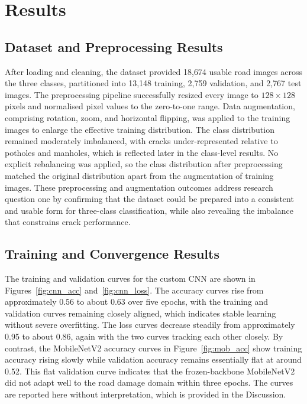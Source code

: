 \documentclass[preprint,12pt]{elsarticle}
\begin{document}
\section{Results}
\label{sec:results}

\subsection{Dataset and Preprocessing Results}

After loading and cleaning, the dataset provided 18{,}674 usable road images across the three classes, partitioned into 13{,}148 training, 2{,}759 validation, and 2{,}767 test images.
The preprocessing pipeline successfully resized every image to $128 \times 128$ pixels and normalised pixel values to the zero-to-one range.
Data augmentation, comprising rotation, zoom, and horizontal flipping, was applied to the training images to enlarge the effective training distribution.
The class distribution remained moderately imbalanced, with cracks under-represented relative to potholes and manholes, which is reflected later in the class-level results.
No explicit rebalancing was applied, so the class distribution after preprocessing matched the original distribution apart from the augmentation of training images.
These preprocessing and augmentation outcomes address research question one by confirming that the dataset could be prepared into a consistent and usable form for three-class classification, while also revealing the imbalance that constrains crack performance.

\subsection{Training and Convergence Results}

The training and validation curves for the custom CNN are shown in Figures~\ref{fig:cnn_acc} and~\ref{fig:cnn_loss}.
The accuracy curves rise from approximately 0.56 to about 0.63 over five epochs, with the training and validation curves remaining closely aligned, which indicates stable learning without severe overfitting.
The loss curves decrease steadily from approximately 0.95 to about 0.86, again with the two curves tracking each other closely.
By contrast, the MobileNetV2 accuracy curves in Figure~\ref{fig:mob_acc} show training accuracy rising slowly while validation accuracy remains essentially flat at around 0.52.
This flat validation curve indicates that the frozen-backbone MobileNetV2 did not adapt well to the road damage domain within three epochs.
The curves are reported here without interpretation, which is provided in the Discussion.
\end{document}
